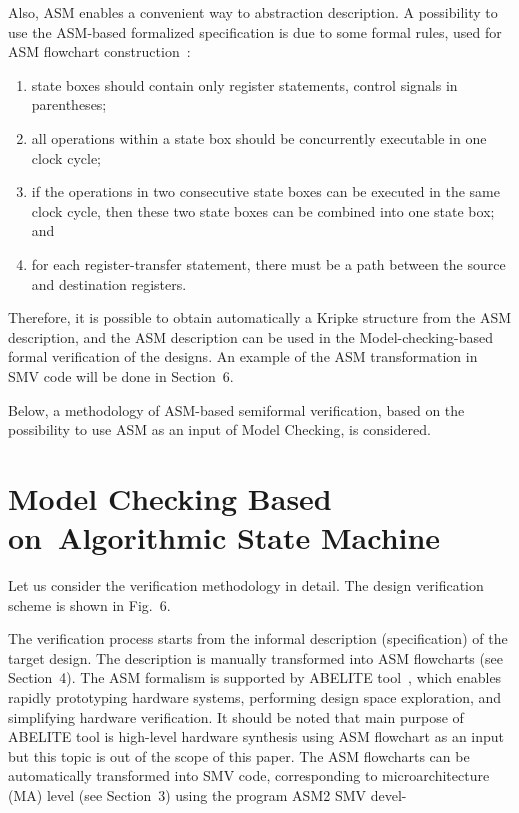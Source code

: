 \begin{multicols}{2}
Also, ASM enables a convenient way to abstraction description. A possibility to use the 
ASM-based formalized specification is due to some formal rules, used for ASM flowchart 
construction~\cite{5fr}:
\begin{enumerate}[(1)]
\item state boxes should contain only register statements, control signals in parentheses;
\item all operations within a state box should be concurrently executable in one clock cycle;
\item  if the operations in two consecutive state boxes can be executed in the same clock cycle, 
then these two state boxes can be combined into one state box; and
\item for each register-transfer statement, there must be a path between the source and 
destination registers.      
\end{enumerate}
       
       Therefore, it is possible to obtain automatically a Kripke structure from the ASM 
description, and the ASM description can be used in the Model-checking-based formal 
verification of the designs. An example of the ASM transformation in SMV code will be done 
in Section~6.

Below, a methodology of ASM-based semiformal verification, based on the 
possibility to use ASM as an input of Model Checking,  is considered.

\vspace*{-6pt}

\section{Model Checking Based on~Algorithmic State Machine}

\vspace*{-2pt}
   
\noindent
Let us consider the verification methodology in detail. The design verification scheme is 
shown in Fig.~6.

   
   The verification process starts from the informal description (specification) of the target 
design. The description is manually transformed into ASM flowcharts (see Section~4). The ASM 
formalism is supported by 
ABELITE tool~\cite{5fr}, which enables rapidly prototyping 
hardware systems, performing design space exploration, and simplifying hardware verification. It 
should be noted that main purpose of ABELITE tool is high-level hardware synthesis using 
ASM flowchart as an input~\cite{5fr} but this topic is out of the scope of this paper. The ASM 
flowcharts can be automatically transformed into SMV code, corresponding to microarchitecture (MA)
level  (see Section~3) using the program ASM2 SMV devel-\linebreak\vspace*{-12pt}


\end{multicols}

